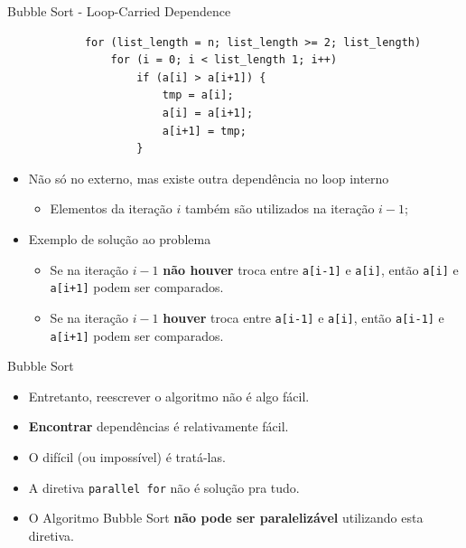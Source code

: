 	\begin{frame}[fragile]{Bubble Sort - Loop-Carried Dependence}
		\begin{verbatim}
			for (list_length = n; list_length >= 2; list_length) 
				for (i = 0; i < list_length 1; i++)
					if (a[i] > a[i+1]) { 
						tmp = a[i];
						a[i] = a[i+1];
						a[i+1] = tmp;
					}
		\end{verbatim}
		\begin{itemize}
			\setlength\itemsep{1em}
			\item Não só no externo, mas existe outra dependência no loop interno
			\begin{itemize}
				\item Elementos da iteração $i$ também são utilizados na iteração $i-1$;
			\end{itemize}
			\item Exemplo de solução ao problema
			\begin{itemize}
				\setlength\itemsep{0.5em}
				\item Se na iteração $i-1$ \textbf{não houver} troca entre {\tt a[i-1]} e {\tt a[i]}, então {\tt a[i]} e {\tt a[i+1]} podem ser comparados.
				\item Se na iteração $i-1$ \textbf{houver} troca entre {\tt a[i-1]} e {\tt a[i]}, então {\tt a[i-1]} e {\tt a[i+1]} podem ser comparados.
			\end{itemize}
		\end{itemize}
\end{frame}

			
	\begin{frame}{Bubble Sort}
		\begin{itemize}
			\setlength\itemsep{1em}
			\item Entretanto, reescrever o algoritmo não é algo fácil.
			\item \textbf{Encontrar} dependências é relativamente fácil. 
			\item O difícil (ou impossível) é tratá-las.
					\bigskip
			\item A diretiva {\tt parallel for} não é solução pra tudo.
					\bigskip
			\item O Algoritmo Bubble Sort \textbf{não pode ser paralelizável} utilizando esta diretiva.
		\end{itemize}
	\end{frame}










